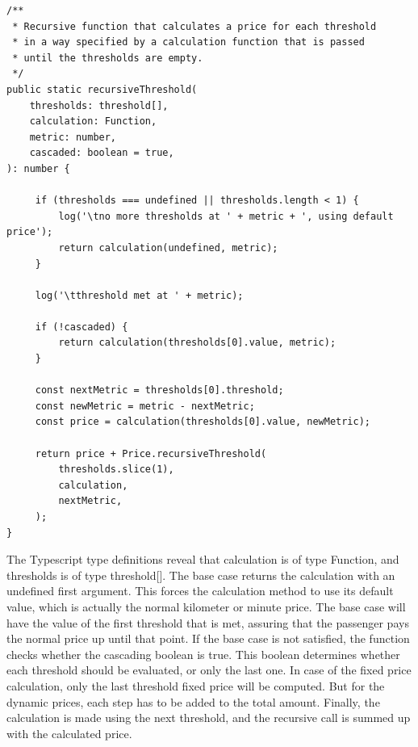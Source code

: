 \begin{center}
\noindent\begin{minipage}{.85\textwidth}
\begin{lstlisting}[caption={Recursive threshold calculation.}, label={lst:threshold-recursion}]
/**
 * Recursive function that calculates a price for each threshold
 * in a way specified by a calculation function that is passed
 * until the thresholds are empty.
 */
public static recursiveThreshold(
	thresholds: threshold[],
	calculation: Function,
	metric: number,
	cascaded: boolean = true,
): number {

	 if (thresholds === undefined || thresholds.length < 1) {
		 log('\tno more thresholds at ' + metric + ', using default price');
		 return calculation(undefined, metric);
	 }

	 log('\tthreshold met at ' + metric);

	 if (!cascaded) {
		 return calculation(thresholds[0].value, metric);
	 }

	 const nextMetric = thresholds[0].threshold;
	 const newMetric = metric - nextMetric;
	 const price = calculation(thresholds[0].value, newMetric);

	 return price + Price.recursiveThreshold(
		 thresholds.slice(1),
		 calculation,
		 nextMetric,
	 );
}
\end{lstlisting}
\end{minipage}
\end{center}

The Typescript type definitions reveal that calculation is of type Function, and thresholds is of type threshold[]. The base case returns the calculation with an undefined first argument. This forces the calculation method to use its default value, which is actually the normal kilometer or minute price. The base case will have the value of the first threshold that is met, assuring that the passenger pays the normal price up until that point. If the base case is not satisfied, the function checks whether the cascading boolean is true. This boolean determines whether each threshold should be evaluated, or only the last one. In case of the fixed price calculation, only the last threshold fixed price will be computed. But for the dynamic prices, each step has to be added to the total amount. Finally, the calculation is made using the next threshold,  and the recursive call is summed up with the calculated price.

%
